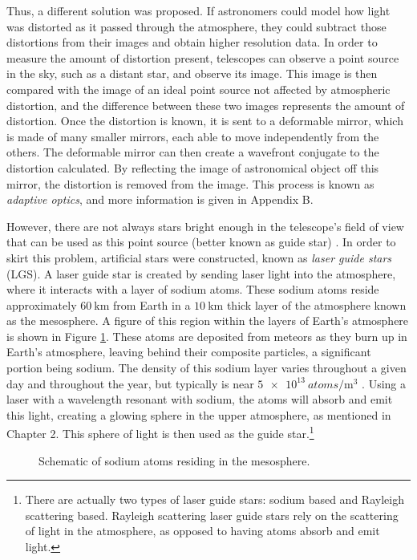 Thus, a different solution was proposed. If astronomers could model how light was distorted as it passed through the atmosphere, they could subtract those distortions from their images and obtain higher resolution data. In order to measure the amount of distortion present, telescopes can observe a point source in the sky, such as a distant star, and observe its image. This image is then compared with the image of an ideal point source not affected by atmospheric distortion, and the difference between these two images represents the amount of distortion. Once the distortion is known, it is sent to a deformable mirror, which is made of many smaller mirrors, each able to move independently from the others. The deformable mirror can then create a wavefront conjugate to the distortion calculated. By reflecting the image of astronomical object off this mirror, the distortion is removed from the image. This process is known as \textit{adaptive optics}, and more information is given in Appendix B.


However, there are not always stars bright enough in the telescope's field of view that can be used as this point source (better known as  guide star) \cite{Wizinowich2006}. In order to skirt this problem, artificial stars were constructed, known as \textit{laser guide stars} (LGS). A laser guide star is created by sending laser light into the atmosphere, where it interacts with a layer of sodium atoms. These sodium atoms reside approximately $\SI{60}{\kilo\meter}$ from Earth in a $\SI{10}{\kilo\meter}$ thick layer of the atmosphere known as the mesosphere. A figure of this region within the layers of Earth's atmosphere is shown in Figure \ref{fig:mesosphere}. These atoms are deposited from meteors as they burn up in Earth's atmosphere, leaving behind their composite particles, a significant portion being sodium. The density of this sodium layer varies throughout a given day and throughout the year, but typically is near $\SI{5e13}{atoms \per \meter \cubed}$ \cite{Kibblewhite2009}. Using a laser with a wavelength resonant with sodium,  the atoms will absorb and emit this light, creating a glowing sphere in the upper atmosphere, as mentioned in Chapter 2. This sphere of light is then used as the guide star.\footnote{There are actually two types of laser guide stars: sodium based and Rayleigh scattering based. Rayleigh scattering laser guide stars rely on the scattering of light in the atmosphere, as opposed to having atoms absorb and emit light.}

\begin{figure}
		\center
		
	\caption{Schematic of sodium atoms residing in the mesosphere.}
	\label{fig:mesosphere}
\end{figure}



